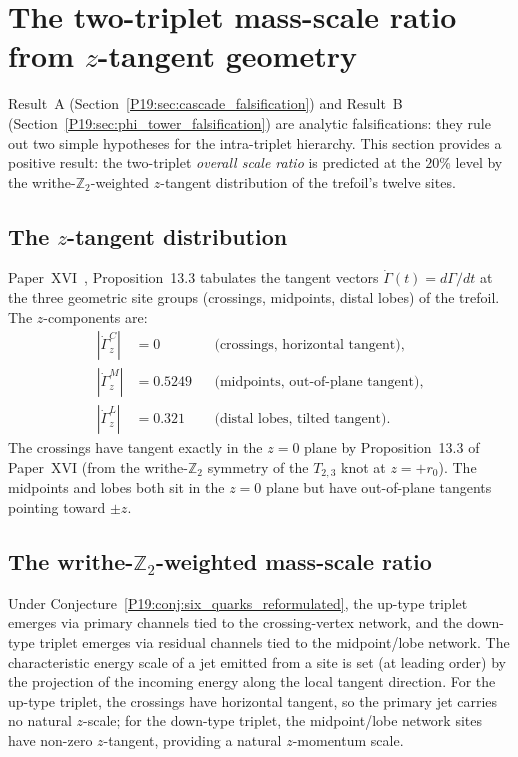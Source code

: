 \documentclass[11pt,a4paper]{article}
\theoremstyle{definition}\newtheorem{definition}[theorem]{Definition}
\theoremstyle{remark}
\newcommand{\Ztwo}{\mathbb{Z}_2}
\newcommand{\tang}{\dot\Gamma}
\begin{document}
\section{The two-triplet mass-scale ratio from $z$-tangent geometry}
\label{P19:sec:tangent_ratio_prediction}

Result~A (Section~\ref{P19:sec:cascade_falsification}) and Result~B
(Section~\ref{P19:sec:phi_tower_falsification}) are analytic
falsifications: they rule out two simple hypotheses for the
intra-triplet hierarchy.  This section provides a positive result:
the two-triplet \emph{overall scale ratio} is predicted at the
$20\%$ level by the writhe-$\Ztwo$-weighted $z$-tangent distribution
of the trefoil's twelve sites.

\subsection{The $z$-tangent distribution}

Paper~XVI~\cite{Paper16}, Proposition~13.3 tabulates the tangent %
vectors $\tang(t)=d\Gamma/dt$ at the three geometric site groups
(crossings, midpoints, distal lobes) of the trefoil.  The
$z$-components are:
\begin{align}
  |\tang_z^C| &= 0 &&\text{(crossings, horizontal tangent),} \\
  |\tang_z^M| &= 0.5249 &&\text{(midpoints, out-of-plane tangent),} \\
  |\tang_z^L| &= 0.321 &&\text{(distal lobes, tilted tangent).}
  \label{P19:eq:tangent_z_values}
\end{align}
The crossings have tangent exactly in the $z=0$ plane by
Proposition~13.3 of Paper~XVI (from the writhe-$\Ztwo$ symmetry of the %
$T_{2,3}$ knot at $z=+r_0$).  The midpoints and lobes both sit in
the $z=0$ plane but have out-of-plane tangents pointing toward
$\pm z$.

\subsection{The writhe-$\Ztwo$-weighted mass-scale ratio}

Under Conjecture~\ref{P19:conj:six_quarks_reformulated}, the up-type
triplet emerges via primary channels tied to the crossing-vertex
network, and the down-type triplet emerges via residual channels
tied to the midpoint/lobe network.  The characteristic energy scale
of a jet emitted from a site is set (at leading order) by the
projection of the incoming energy along the local tangent
direction.  For the up-type triplet, the crossings have
horizontal tangent, so the primary jet carries no natural $z$-scale;
for the down-type triplet, the midpoint/lobe network sites have
non-zero $z$-tangent, providing a natural $z$-momentum scale.
\end{document}
